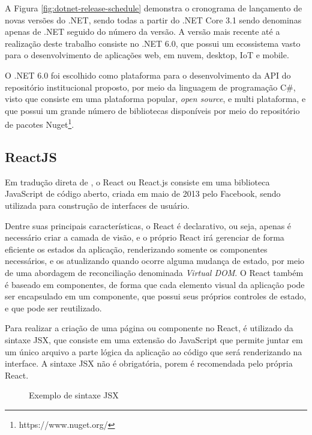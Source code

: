A Figura \ref{fig:dotnet-release-schedule} demonstra o cronograma de lançamento
de novas versões do .NET, sendo todas a partir do .NET Core 3.1 sendo denominas
apenas de .NET seguido do número da versão. A versão mais recente até a
realização deste trabalho consiste no .NET 6.0, que possui um ecossistema
vasto para o desenvolvimento de aplicações web, em nuvem, desktop, IoT
e mobile.

O .NET 6.0 foi escolhido como plataforma para o desenvolvimento da API do
repositório institucional proposto, por meio da linguagem de programação C\#,
visto que consiste em uma plataforma popular, \emph{open source}, e multi
plataforma, e que possui um grande número de bibliotecas disponíveis
por meio do repositório de pacotes Nuget\footnote{https://www.nuget.org/}.

\subsection{ReactJS}

Em tradução direta de \citep[p. 30]{Thakkar:2020}, o React ou React.js consiste em uma
biblioteca JavaScript de código aberto, criada em maio de 2013 pelo Facebook,
sendo utilizada para construção de interfaces de usuário.

Dentre suas principais características, o React é declarativo, ou seja,
apenas é necessário criar a camada de visão, e o próprio React irá gerenciar
de forma eficiente os estados da aplicação, renderizando somente os componentes
necessários, e os atualizando quando ocorre alguma mudança de estado, por meio
de uma abordagem de reconciliação denominada \emph{Virtual DOM}. O React
também é baseado em componentes, de forma que cada elemento visual da aplicação
pode ser encapsulado em um componente, que possui seus próprios controles de estado,
e que pode ser reutilizado.

Para realizar a criação de uma página ou componente no React, é utilizado da
sintaxe JSX, que consiste em uma extensão do JavaScript que permite juntar
em um único arquivo a parte lógica da aplicação ao código que será renderizando na
interface. A sintaxe JSX não é obrigatória, porem é recomendada pelo própria React.

\begin{figure}[H]
    \caption{Exemplo de sintaxe JSX}
    \centering
    \label{fig:exemple-jsx}
\end{figure}

